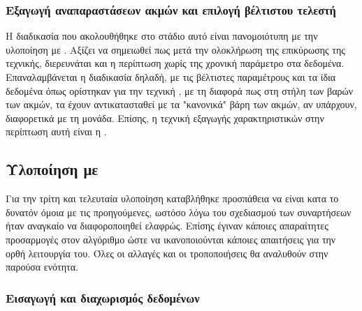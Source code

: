 \subsubsection{Εξαγωγή αναπαραστάσεων ακμών και επιλογή βέλτιστου τελεστή}

Η διαδικασία που ακολουθήθηκε στο στάδιο αυτό είναι πανομοιότυπη με την υλοποίηση με 
. Αξίζει να σημειωθεί πως μετά την ολοκλήρωση της επικύρωσης της τεχνικής,
διερευνάται και η περίπτωση χωρίς της χρονική παράμετρο στα δεδομένα. Επαναλαμβάνεται η 
διαδικασία δηλαδή, με τις βέλτιστες παραμέτρους και τα ίδια δεδομένα όπως ορίστηκαν για την
τεχνική , με τη διαφορά πως στη στήλη των βαρών των ακμών, τα 
έχουν αντικατασταθεί με τα "κανονικά" βάρη των ακμών, αν υπάρχουν, διαφορετικά με τη μονάδα.
Επίσης, η τεχνική εξαγωγής χαρακτηριστικών στην περίπτωση αυτή είναι η .

\subsection{Υλοποίηση με }

Για την τρίτη και τελευταία υλοποίηση καταβλήθηκε προσπάθεια να είναι κατα το δυνατόν
όμοια με τις προηγούμενες, ωστόσο λόγω του σχεδιασμού των συναρτήσεων ήταν αναγκαίο να
διαφοροποιηθεί ελαφρώς. Επίσης έγιναν κάποιες απαραίτητες προσαρμογές στον αλγόριθμο
ώστε να ικανοποιούνται κάποιες απαιτήσεις για την ορθή λειτουργία του. Όλες οι αλλαγές
και οι τροποποιήσεις θα αναλυθούν στην παρούσα ενότητα.

\subsubsection{Εισαγωγή και διαχωρισμός δεδομένων}


